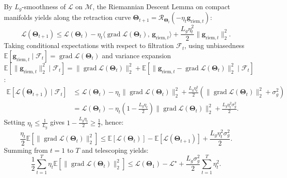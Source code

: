 \documentclass[journal]{IEEEtran}
\begin{document}
\begin{IEEEproof}
By $L_g$-smoothness of $\mathcal{L}$ on $\mathcal{M}$, the Riemannian Descent Lemma on compact manifolds \cite{absil2008optimization,boumal2023intromanifolds} yields along the retraction curve $\boldsymbol{\Theta}_{t+1} = \mathcal{R}_{\boldsymbol{\Theta}_t}(-\eta_t \mathbf{g}_{\text{riem},t})$:
\begin{equation}
\mathcal{L}(\boldsymbol{\Theta}_{t+1}) \le \mathcal{L}(\boldsymbol{\Theta}_t) - \eta_t \langle \operatorname{grad}\mathcal{L}(\boldsymbol{\Theta}_t), \, \mathbf{g}_{\text{riem},t} \rangle + \frac{L_g \eta_t^2}{2}\|\mathbf{g}_{\text{riem},t}\|_2^2.
\end{equation}
Taking conditional expectations with respect to filtration $\mathcal{F}_t$, using unbiasedness $\mathbb{E}[\mathbf{g}_{\text{riem},t}\mid\mathcal{F}_t] = \operatorname{grad}\mathcal{L}(\boldsymbol{\Theta}_t)$ and variance expansion $\mathbb{E}[\|\mathbf{g}_{\text{riem},t}\|_2^2\mid\mathcal{F}_t] = \|\operatorname{grad}\mathcal{L}(\boldsymbol{\Theta}_t)\|_2^2 + \mathbb{E}[\|\mathbf{g}_{\text{riem},t} - \operatorname{grad}\mathcal{L}(\boldsymbol{\Theta}_t)\|_2^2\mid\mathcal{F}_t]$:
\begin{align}
\mathbb{E}[\mathcal{L}(\boldsymbol{\Theta}_{t+1})\mid\mathcal{F}_t] &\le \mathcal{L}(\boldsymbol{\Theta}_t) - \eta_t\|\operatorname{grad}\mathcal{L}(\boldsymbol{\Theta}_t)\|_2^2 + \frac{L_g\eta_t^2}{2}\left(\|\operatorname{grad}\mathcal{L}(\boldsymbol{\Theta}_t)\|_2^2 + \sigma_g^2\right) \nonumber \\
&= \mathcal{L}(\boldsymbol{\Theta}_t) - \eta_t\left(1 - \frac{L_g\eta_t}{2}\right)\|\operatorname{grad}\mathcal{L}(\boldsymbol{\Theta}_t)\|_2^2 + \frac{L_g\eta_t^2\sigma_g^2}{2}.
\end{align}
Setting $\eta_t \le \frac{1}{L_g}$ gives $1 - \frac{L_g\eta_t}{2} \ge \frac{1}{2}$, hence:
\begin{equation}
\frac{\eta_t}{2}\mathbb{E}[\|\operatorname{grad}\mathcal{L}(\boldsymbol{\Theta}_t)\|_2^2] \le \mathbb{E}[\mathcal{L}(\boldsymbol{\Theta}_t)] - \mathbb{E}[\mathcal{L}(\boldsymbol{\Theta}_{t+1})] + \frac{L_g\eta_t^2\sigma_g^2}{2}.
\end{equation}
Summing from $t=1$ to $T$ and telescoping yields:
\begin{equation}
\frac{1}{2}\sum_{t=1}^T \eta_t \mathbb{E}[\|\operatorname{grad}\mathcal{L}(\boldsymbol{\Theta}_t)\|_2^2] \le \mathcal{L}(\boldsymbol{\Theta}_1) - \mathcal{L}^\star + \frac{L_g\sigma_g^2}{2}\sum_{t=1}^T \eta_t^2.
\end{equation}

\end{IEEEproof}
\end{document}
